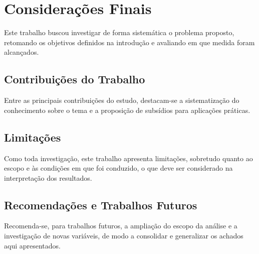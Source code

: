 \chapter{Considerações Finais}
\label{cap:consideracoes-finais}


Este trabalho buscou investigar de forma sistemática o problema proposto, retomando os objetivos definidos na introdução e avaliando em que medida foram alcançados.

\section{Contribuições do Trabalho}
\label{sec:contribuicoes-do-trabalho}

Entre as principais contribuições do estudo, destacam-se a sistematização do conhecimento sobre o tema e a proposição de subsídios para aplicações práticas.

\section{Limitações}
\label{sec:limitacoes}

Como toda investigação, este trabalho apresenta limitações, sobretudo quanto ao escopo e às condições em que foi conduzido, o que deve ser considerado na interpretação dos resultados.

\section{Recomendações e Trabalhos Futuros}
\label{sec:recomendacoes-e-trabalhos-futuros}

Recomenda-se, para trabalhos futuros, a ampliação do escopo da análise e a investigação de novas variáveis, de modo a consolidar e generalizar os achados aqui apresentados.
